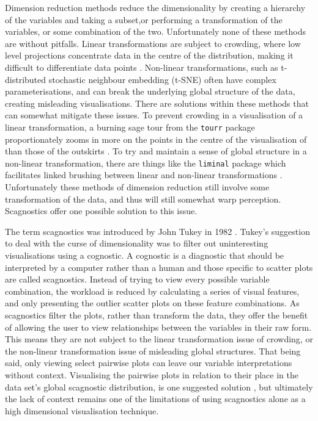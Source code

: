 Dimension reduction methods reduce the dimensionality by creating a
hierarchy of the variables and taking a subset,or performing a
transformation of the variables, or some combination of the two.
Unfortunately none of these methods are without pitfalls. Linear
transformations are subject to crowding, where low level projections
concentrate data in the centre of the distribution, making it difficult
to differentiate data points \citep{crowding}. Non-linear
transformations, such as t-distributed stochastic neighbour embedding
(t-SNE) \citep{tsne} often have complex parameterisations, and can break
the underlying global structure of the data, creating misleading
visualisations. There are solutions within these methods that can
somewhat mitigate these issues. To prevent crowding in a visualisation
of a linear transformation, a burning sage tour from the \texttt{tourr}
package proportionately zooms in more on the points in the centre of the
visualisation of than those of the outskirts \citep{burningsage}. To try
and maintain a sense of global structure in a non-linear transformation,
there are things like the \texttt{liminal} package which facilitates
linked brushing between linear and non-linear transformations
\citep{liminal}. Unfortunately these methods of dimension reduction
still involve some transformation of the data, and thus will still
somewhat warp perception. Scagnostics offer one possible solution to
this issue.

The term scagnostics was introduced by John Tukey in 1982 \citep{tukey}.
Tukey's suggestion to deal with the curse of dimensionality was to
filter out uninteresting visualisations using a cognostic. A cognostic
is a diagnostic that should be interpreted by a computer rather than a
human and those specific to scatter plots are called scagnostics.
Instead of trying to view every possible variable combination, the
workload is reduced by calculating a series of visual features, and only
presenting the outlier scatter plots on these feature combinations. As
scagnostics filter the plots, rather than transform the data, they offer
the benefit of allowing the user to view relationships between the
variables in their raw form. This means they are not subject to the
linear transformation issue of crowding, or the non-linear
transformation issue of misleading global structures. That being said,
only viewing select pairwise plots can leave our variable
interpretations without context. Visualising the pairwise plots in
relation to their place in the data set's global scagnostic
distribution, is one suggested solution \citep{scagexplorer}, but
ultimately the lack of context remains one of the limitations of using
scagnostics alone as a high dimensional visualisation technique.

